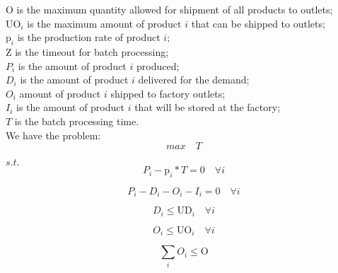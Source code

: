 \documentclass[preprint,12pt,authoryear]{elsarticle}
\begin{document}
$\textrm{O}$ is the maximum quantity allowed for shipment of all products to outlets; \\

$\textrm{UO}_i$ is the maximum amount of product $i$ that can be shipped to outlets; \\ 

$\textrm{p}_i$ is the production rate of product $i$; \\

$\textrm{Z}$ is the timeout for batch processing; \\

$P_i$ is the amount of product $i$ produced; \\

$D_i$ is the amount of product $i$ delivered for the demand; \\

$O_i$ amount of product $i$ shipped to factory outlets; \\

$I_i$ is the amount of product $i$ that will be stored at the factory; \\

$T$ is the batch processing time. \\

We have the problem: \\

\begin{equation}
max \quad T
\end{equation}

$s.t.$ \\

\begin{equation}
P_i - \textrm{p}_i * T  = 0 \quad \forall i
\end{equation}

\begin{equation}
P_i - D_i - O_i - I_i = 0 \quad \forall i
\end{equation}

\begin{equation}
D_i \leq \textrm{UD}_i \quad \forall i
\end{equation}

\begin{equation}
O_i \leq \textrm{UO}_i \quad \forall i
\end{equation}

\begin{equation}
\sum_i{O_i} \leq \textrm{O}
\end{equation}
\end{document}
